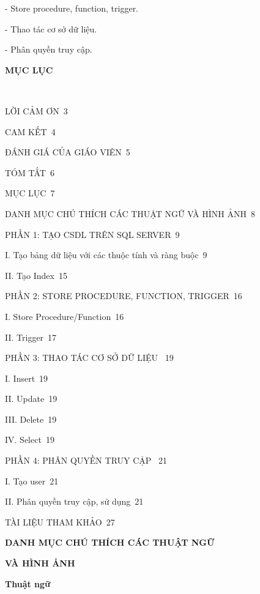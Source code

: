 \documentclass{report}
\begin{document}
- Store procedure, function, trigger.

- Thao tác cơ sở dữ liệu.

- Phân quyền truy cập.




\newpage
\changefontsizes{16pt}
\centerline{\textbf{MỤC LỤC}}\

\vspace{1.2cm}
\changefontsizes{14pt}
\setlength{\parindent}{0cm}
LỜI CẢM ƠN\dotfill\ 3

\smallskip
CAM KẾT\dotfill\ 4

\smallskip
ĐÁNH GIÁ CỦA GIÁO VIÊN\dotfill\ 5

\smallskip
TÓM TẮT\dotfill\ 6

\smallskip
MỤC LỤC\dotfill\ 7

\smallskip
DANH MỤC CHÚ THÍCH CÁC THUẬT NGỮ VÀ HÌNH ẢNH\dotfill\ 8

\smallskip
PHẦN 1: TẠO CSDL TRÊN SQL SERVER\dotfill\ 9

\setlength{\parindent}{0.5cm}
I. Tạo bảng dữ liệu với các thuộc tính và ràng buộc\dotfill\ 9

II. Tạo Index\dotfill\ 15

\setlength{\parindent}{0cm}
PHẦN 2: STORE PROCEDURE, FUNCTION, TRIGGER\dotfill\ 16

\setlength{\parindent}{0.5cm}
I. Store Procedure/Function\dotfill\ 16

II. Trigger\dotfill\ 17

\setlength{\parindent}{0cm}
PHẦN 3: THAO TÁC CƠ SỞ DỮ LIỆU \dotfill\ 19

\setlength{\parindent}{0.5cm}
I. Insert\dotfill\ 19

II. Update\dotfill\ 19

III. Delete\dotfill\ 19

IV.  Select\dotfill\ 19

\setlength{\parindent}{0cm}
PHẦN 4: PHÂN QUYỀN TRUY CẬP \dotfill\ 21

\setlength{\parindent}{0.5cm}
I. Tạo user\dotfill\ 21

II. Phân quyền truy cập, sử dụng\dotfill\ 21


\setlength{\parindent}{0cm}
\smallskip
TÀI LIỆU THAM KHẢO\dotfill\ 27

\newpage
\changefontsizes{16pt}
\centerline{\textbf{DANH MỤC CHÚ THÍCH CÁC THUẬT NGỮ}}
\centerline{\textbf{VÀ HÌNH ẢNH}}

\vspace{1cm}
\changefontsizes{14pt}
\textbf{Thuật ngữ}
\end{document}
